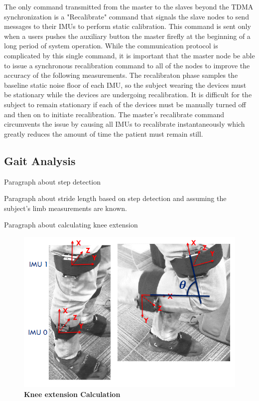 \documentclass[conference]{IEEEtran}
\begin{document}
  The only command transmitted from the master to the slaves beyond the TDMA synchronization
is a "Recalibrate" command that signals the slave nodes to send messages to their IMUs to
perform static calibration. This command is sent only when a users pushes the auxiliary
button the master firefly at the beginning of a long period of system operation. While the
communication protocol is complicated by this single command, it is important that the
master node be able to issue a synchronous recalibration command to all of the nodes to
improve the accuracy of the following measurements. The recalibraton phase samples the
baseline static noise floor of each IMU, so the subject wearing the devices must be
stationary while the devices are undergoing recalibration. It is difficult for the subject
to remain stationary if each of the devices must be manually turned off and then on to initiate
recalibration. The master's recalibrate command circumvents the issue by causing all IMUs
to recalibrate instantaneously which greatly reduces the amount of time the patient must
remain still. 

\subsection{Gait Analysis}
  Paragraph about step detection 

  Paragraph about stride length based on step detection and assuming the subject's limb
  measurements are known. 

  Paragraph about calculating knee extension 

\begin{figure}[h]
  \centering
  \includegraphics[width=0.8\columnwidth]{figs/knees}
  \caption{{\bf Knee extension Calculation}}
  \label{fig:knees}
\end{figure}
\end{document}
